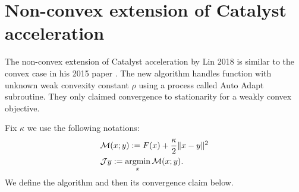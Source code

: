 \documentclass[12pt]{article}
\begin{document}
\section{Non-convex extension of Catalyst acceleration}\label{sec:4wd-catalyst}
    The non-convex extension of Catalyst acceleration by Lin 2018 \cite{lin_catalyst_2018} is similar to the convex case in his 2015 paper \cite{lin_universal_2015}. 
    The new algorithm handles function with unknown weak convexity constant $\rho$ using a process called Auto Adapt subroutine. 
    They only claimed convergence to stationarity for a weakly convex objective. 
    \par 
    Fix $\kappa$ we use the following notations: 
    \begin{align*}
       & \mathcal M (x; y) := F(x) + \frac{\kappa}{2}\Vert x - y\Vert^2 
       \\
       & \mathcal J y := \mathop{\rm argmin}\limits_x \mathcal M (x; y). 
    \end{align*}
    We define the algorithm and then its convergence claim below. 
\end{document}
